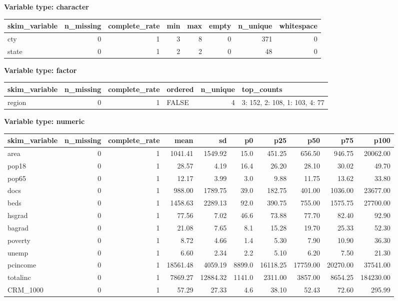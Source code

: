 \documentclass[
]{article}
\begin{document}
\textbf{Variable type: character}

\begin{longtable}[]{@{}lrrrrrrr@{}}
\toprule
skim\_variable & n\_missing & complete\_rate & min & max & empty &
n\_unique & whitespace \\
\midrule
\endhead
cty & 0 & 1 & 3 & 8 & 0 & 371 & 0 \\
state & 0 & 1 & 2 & 2 & 0 & 48 & 0 \\
\bottomrule
\end{longtable}

\textbf{Variable type: factor}

\begin{longtable}[]{@{}lrrlrl@{}}
\toprule
skim\_variable & n\_missing & complete\_rate & ordered & n\_unique &
top\_counts \\
\midrule
\endhead
region & 0 & 1 & FALSE & 4 & 3: 152, 2: 108, 1: 103, 4: 77 \\
\bottomrule
\end{longtable}

\textbf{Variable type: numeric}

\begin{longtable}[]{@{}lrrrrrrrrr@{}}
\toprule
skim\_variable & n\_missing & complete\_rate & mean & sd & p0 & p25 &
p50 & p75 & p100 \\
\midrule
\endhead
area & 0 & 1 & 1041.41 & 1549.92 & 15.0 & 451.25 & 656.50 & 946.75 &
20062.00 \\
pop18 & 0 & 1 & 28.57 & 4.19 & 16.4 & 26.20 & 28.10 & 30.02 & 49.70 \\
pop65 & 0 & 1 & 12.17 & 3.99 & 3.0 & 9.88 & 11.75 & 13.62 & 33.80 \\
docs & 0 & 1 & 988.00 & 1789.75 & 39.0 & 182.75 & 401.00 & 1036.00 &
23677.00 \\
beds & 0 & 1 & 1458.63 & 2289.13 & 92.0 & 390.75 & 755.00 & 1575.75 &
27700.00 \\
hsgrad & 0 & 1 & 77.56 & 7.02 & 46.6 & 73.88 & 77.70 & 82.40 & 92.90 \\
bagrad & 0 & 1 & 21.08 & 7.65 & 8.1 & 15.28 & 19.70 & 25.33 & 52.30 \\
poverty & 0 & 1 & 8.72 & 4.66 & 1.4 & 5.30 & 7.90 & 10.90 & 36.30 \\
unemp & 0 & 1 & 6.60 & 2.34 & 2.2 & 5.10 & 6.20 & 7.50 & 21.30 \\
pcincome & 0 & 1 & 18561.48 & 4059.19 & 8899.0 & 16118.25 & 17759.00 &
20270.00 & 37541.00 \\
totalinc & 0 & 1 & 7869.27 & 12884.32 & 1141.0 & 2311.00 & 3857.00 &
8654.25 & 184230.00 \\
CRM\_1000 & 0 & 1 & 57.29 & 27.33 & 4.6 & 38.10 & 52.43 & 72.60 &
295.99 \\
\bottomrule
\end{longtable}
\end{document}
